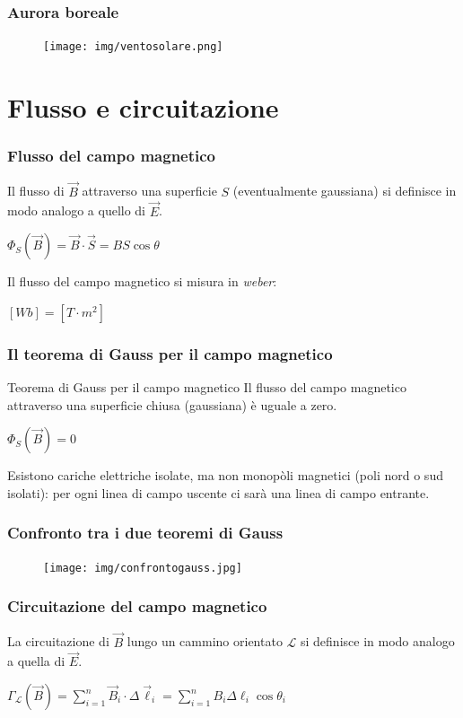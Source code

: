 \documentclass[]{beamer}
\theoremstyle{plain}
\begin{document}
\begin{frame}
\frametitle{Aurora boreale}
\begin{figure}
\texttt{[image: img/ventosolare.png]}
\end{figure}
\end{frame}


\section{Flusso e circuitazione}

\begin{frame}
\frametitle{Flusso  del campo magnetico}
Il flusso di $ \vec{B} $ attraverso una superficie $ S $ (eventualmente gaussiana) si definisce in modo analogo a quello di $ \vec{E} $. 
\begin{center}
\colorbox{blue!30}{$ \Phi_{S}(\vec{B}) = \vec{B} \cdot \vec{S} = BS\cos\theta $}
\end{center}\pause
Il flusso del campo magnetico si misura in \emph{weber}:
\begin{center}
$ [Wb] = [T\cdot m^2] $
\end{center}
\end{frame}


\begin{frame}
\frametitle{Il teorema di Gauss per il campo magnetico}
\begin{block}{Teorema di Gauss per il campo magnetico}
Il flusso del campo magnetico attraverso una superficie chiusa (gaussiana) è uguale a zero.
\begin{center}
\colorbox{blue!30}{$ \Phi_S (\vec{B}) = 0 $}
\end{center}
\end{block}\pause
Esistono cariche elettriche isolate, ma non monopòli magnetici (poli nord o sud isolati): \alert{per ogni linea di campo uscente ci sarà una linea di campo entrante}.
\end{frame}


\begin{frame}
\frametitle{Confronto tra i due teoremi di Gauss}
\begin{figure}
\texttt{[image: img/confrontogauss.jpg]}
\end{figure}
\end{frame}



\begin{frame}
\frametitle{Circuitazione del campo magnetico}
La circuitazione di $ \vec{B} $ lungo un cammino orientato $ \mathscr{L} $ si definisce in modo analogo a quella di $ \vec{E} $. 
\begin{center}
\colorbox{blue!30}{$ \Gamma_\mathscr{L} (\vec{B}) = \sum\limits_{i=1}^n \vec{B}_i \cdot \Delta \vec{\ell}_i =  \sum\limits_{i=1}^n B_i \Delta \ell_i \cos\theta_i $}
\end{center}
\end{frame}
\end{document}
